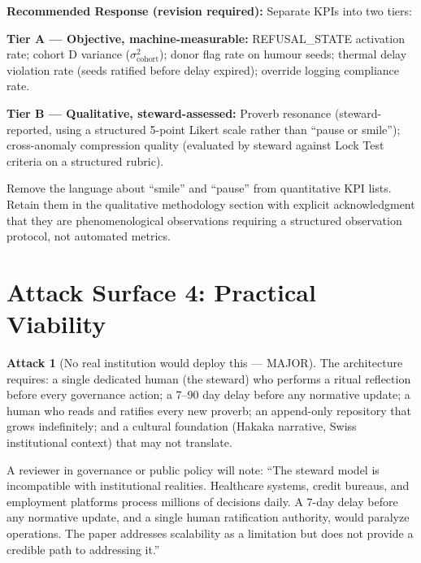 \documentclass[12pt,a4paper]{article}
\theoremstyle{definition}
\newtheorem{attack}{Attack}[section]
\begin{document}
\begin{mdframed}[style=defenseframe]
\textbf{Recommended Response (revision required):}
Separate KPIs into two tiers:

\textbf{Tier A — Objective, machine-measurable:} REFUSAL\_STATE activation
rate; cohort D variance ($\sigma^2_\text{cohort}$); donor flag rate on
humour seeds; thermal delay violation rate (seeds ratified before delay
expired); override logging compliance rate.

\textbf{Tier B — Qualitative, steward-assessed:} Proverb resonance
(steward-reported, using a structured 5-point Likert scale rather than
``pause or smile''); cross-anomaly compression quality (evaluated by
steward against Lock Test criteria on a structured rubric).

Remove the language about ``smile'' and ``pause'' from quantitative KPI
lists. Retain them in the qualitative methodology section with explicit
acknowledgment that they are phenomenological observations requiring a
structured observation protocol, not automated metrics.
\end{mdframed}

\section{Attack Surface 4: Practical Viability}

\begin{attack}[No real institution would deploy this — MAJOR]
\label{att:noinstitution}
The architecture requires: a single dedicated human (the steward) who performs
a ritual reflection before every governance action; a 7--90 day delay before any
normative update; a human who reads and ratifies every new proverb; an
append-only repository that grows indefinitely; and a cultural foundation
(Hakaka narrative, Swiss institutional context) that may not translate.

A reviewer in governance or public policy will note: ``The steward model is
incompatible with institutional realities. Healthcare systems, credit bureaus,
and employment platforms process millions of decisions daily. A 7-day delay
before any normative update, and a single human ratification authority, would
paralyze operations. The paper addresses scalability as a limitation but does
not provide a credible path to addressing it.''
\end{attack}
\end{document}
